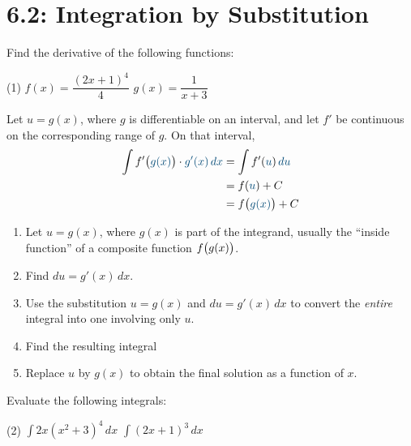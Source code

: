 \documentclass[../mathNotesPreamble]{subfiles}
\providecommand{\relscalefact}{1.4}
\begin{document}
\relscale{\relscalefact}
  \section{6.2: Integration by Substitution}
  \begin{ex*}
    Find the derivative of the following functions:
  \end{ex*}
  \begin{extasks}[after-item-skip=\stretch{1}](1)
    \task $f(x)=\dfrac{(2x+1)^4}{4}$
    \task $g(x)=\dfrac{1}{x+3}$
  \end{extasks}

  \providecommand{\coloredParens}[4]{
    \textcolor{#1}{#2 #3(}
    #4
    \textcolor{#1}{#3)}
  }
  \begin{thmBox*}
    Let $u=g(x)$, where $g$ is differentiable on an interval, and let $f'$ be continuous on the corresponding range of $g$. On that interval,
    \begin{align*}
      \int \textcolor{black}{f'\big(
      \textcolor{lander_blue}{g(x)}
      \big)}\cdot
      \textcolor{lander_blue}{g'(x)\,dx}
      &=\int f'(\textcolor{lander_blue}{u})\,
      \textcolor{lander_blue}{du}\\
      &=f(\textcolor{lander_blue}{u})+C\\
      &=f\big(\textcolor{lander_blue}{g(x)}\big)+C
    \end{align*}
  \end{thmBox*}
  \pagebreak

  \begin{thmBox*}
    \begin{enumerate}
      \item Let $u=g(x)$, where $g(x)$ is part of the integrand, usually the ``inside function'' of a composite function $f{\left(g(x)\vphantom{^1}\right)}$.
      \item Find $du=g'(x)\,dx$.
      \item Use the substitution $u=g(x)$ and $du=g'(x)\,dx$ to convert the \emph{entire} integral into one involving only $u$.
      \item Find the resulting integral
      \item Replace $u$ by $g(x)$ to obtain the final solution as a function of $x$.
    \end{enumerate}
  \end{thmBox*}
   \begin{ex*}
    Evaluate the following integrals:
  \end{ex*}
  \begin{extasks}[after-item-skip=\stretch{1}](2)
    \task $\displaystyle\int 2x(x^2+3)^4\,dx$
    \task $\displaystyle\int (2x+1)^3\, dx$
  \end{extasks}
  \pagebreak
\end{document}

